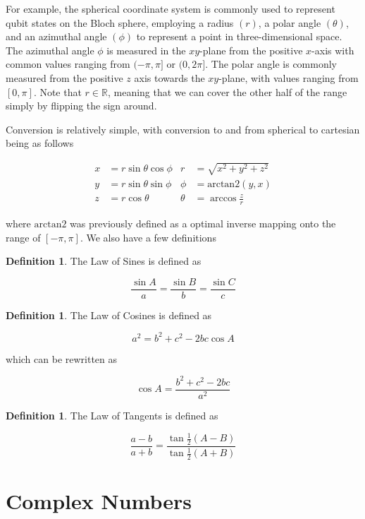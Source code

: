 \documentclass[12pt]{article}
\theoremstyle{definition}
\newtheorem{definition}[theorem]{Definition}
\begin{document}
For example, the spherical coordinate system is commonly used to represent qubit states on the Bloch sphere, employing a radius $(r)$, a polar angle $(\theta)$, and an azimuthal angle $(\phi)$ to represent a point in three-dimensional space. The azimuthal angle $\phi$ is measured in the $xy$-plane from the positive $x$-axis with common values ranging from $(-\pi, \pi]$ or $(0, 2\pi]$. The polar angle is commonly measured from the positive $z$ axis towards the $xy$-plane, with values ranging from $[0, \pi]$. Note that $r \in \mathbb{R}$, meaning that we can cover the other half of the range simply by flipping the sign around. 

Conversion is relatively simple, with conversion to and from spherical to cartesian being as follows

\begin{align*}
    x &= r \sin \theta \cos \phi &     r &= \sqrt{x^2 + y^2 + z^2} \\
    y &= r \sin \theta \sin \phi &     \phi &= \mathrm{arctan2} (y, x) \\
    z &= r \cos \theta &         \theta &= \arccos \frac{z}{r}
\end{align*}

where $\mathrm{arctan2}$ was previously defined as a optimal inverse mapping onto the range of $[- \pi, \pi]$. We also have a few definitions

\begin{definition}
    The Law of Sines is defined as 

    $$\frac{\sin A}{a} = \frac{\sin B}{b} = \frac{\sin C}{c}$$
\end{definition}

\begin{definition}
    The Law of Cosines is defined as 

    $$a^2 = b^2 + c^2 - 2bc \cos A$$

    which can be rewritten as 

    $$\cos A = \frac{b^2 + c^2 - 2bc}{a^2}$$
\end{definition}

\begin{definition}
    The Law of Tangents is defined as 

    $$\frac{a - b}{a + b} = \frac{\tan \frac{1}{2}(A - B)}{\tan \frac{1}{2}(A + B)}$$
\end{definition}


\break


\section{Complex Numbers}
\end{document}
